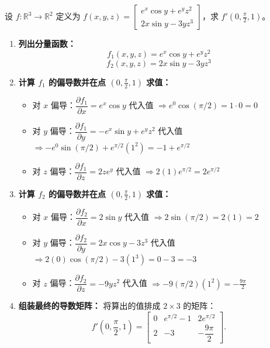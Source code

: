 \documentclass[lang=cn,11pt]{elegantbook}
\begin{document}
\begin{exercise}
设 $f:\mathbb{R}^3\to\mathbb{R}^2$ 定义为 $f(x,y,z) = \begin{bmatrix} e^x\cos y + e^y z^2 \\ 2x\sin y - 3y z^3 \end{bmatrix}$，求 $f'\left(0,\frac{\pi}{2},1\right)$。
\end{exercise}
\begin{solution}
\begin{enumerate}
  \item \textbf{列出分量函数：}
  \[
  f_1(x,y,z) = e^x\cos y + e^y z^2
  \]
  \[
  f_2(x,y,z) = 2x\sin y - 3y z^3
  \]
  
  \item \textbf{计算 $f_1$ 的偏导数并在点 $\left(0,\frac{\pi}{2},1\right)$ 求值：}
  \begin{itemize}
    \item 对 $x$ 偏导：$\dfrac{\partial f_1}{\partial x} = e^x\cos y$
          代入值 $\Rightarrow e^0\cos(\pi/2) = 1 \cdot 0 = 0$
    \item 对 $y$ 偏导：$\dfrac{\partial f_1}{\partial y} = -e^x\sin y + e^y z^2$
          代入值 $\Rightarrow -e^0\sin(\pi/2) + e^{\pi/2}(1^2) = -1 + e^{\pi/2}$
    \item 对 $z$ 偏导：$\dfrac{\partial f_1}{\partial z} = 2z e^y$
          代入值 $\Rightarrow 2(1)e^{\pi/2} = 2e^{\pi/2}$
  \end{itemize}

  \item \textbf{计算 $f_2$ 的偏导数并在点 $\left(0,\frac{\pi}{2},1\right)$ 求值：}
  \begin{itemize}
    \item 对 $x$ 偏导：$\dfrac{\partial f_2}{\partial x} = 2\sin y$
          代入值 $\Rightarrow 2\sin(\pi/2) = 2(1) = 2$
    \item 对 $y$ 偏导：$\dfrac{\partial f_2}{\partial y} = 2x\cos y - 3z^3$
          代入值 $\Rightarrow 2(0)\cos(\pi/2) - 3(1^3) = 0 - 3 = -3$
    \item 对 $z$ 偏导：$\dfrac{\partial f_2}{\partial z} = -9y z^2$
          代入值 $\Rightarrow -9(\pi/2)(1^2) = -\frac{9\pi}{2}$
  \end{itemize}
  
  \item \textbf{组装最终的导数矩阵：}
  将算出的值排成 $2 \times 3$ 的矩阵：
  \[
  f'\left(0,\frac{\pi}{2},1\right) = \begin{bmatrix} 
  0 & e^{\pi/2}-1 & 2e^{\pi/2} \\[6pt] 
  2 & -3 & -\dfrac{9\pi}{2} 
  \end{bmatrix}.
  \]
\end{enumerate}
\end{solution}
\end{document}
